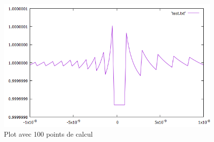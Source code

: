 \begin{figure}[H]
	\caption{\label{ex} Plot avec 100 points de calcul}
	\centering
	\includegraphics[scale = 0.61]{Figures/1_plot.png}
\end{figure}
